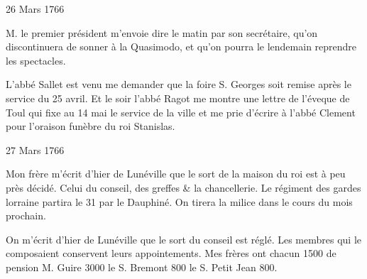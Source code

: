                      \begin{diary}{26 Mars 1766}{}


                           M. le premier président m'envoie dire le
                           matin par son secrétaire, qu'on discontinuera
                           de sonner à la Quasimodo, et qu'on pourra
                           le lendemain reprendre les spectacles. \bigskip



                           L'abbé Sallet est venu me demander
                           que
                           la foire S. Georges soit remise après le
                           service
                           du 25 avril. Et le soir l'abbé Ragot
                           me montre une lettre de
                              l'éveque de Toul
                           qui fixe au 14 mai le service de la
                           ville
                           et me prie d'écrire à l'abbé
                              Clement
                           pour l'oraison funèbre du roi Stanislas.
                        \bigskip


                     \end{diary}

                     \begin{diary}{27 Mars 1766}{}


                           Mon frère m'écrit d'hier de Lunéville que
                           le sort de la maison du roi
                           est à peu près
                           décidé. Celui du conseil, des
                           greffes \&
                           la chancellerie. Le régiment des gardes lorraine
                           partira le 31 par le Dauphiné. On tirera
                           la milice dans le cours
                           du mois prochain. \bigskip



                         On m'écrit d'hier de Lunéville que le sort
                           du conseil est réglé. Les membres
                           qui
                           le composaient conservent leurs appointements.
                           Mes frères
                           ont chacun 1500 de
                           pension M. Guire
                           3000
                           le S. Bremont
                           800
                           le S. Petit Jean
                           800\up{\#}. \bigskip


                     \end{diary}

